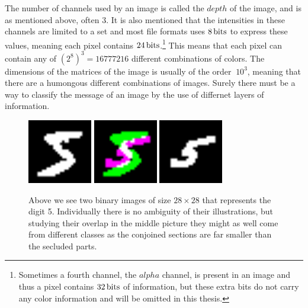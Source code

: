 The number of channels used by an image is called the $depth$ of the image, and is as mentioned above, often 3. It is also mentioned that the intensities in these channels are limited to a set and most file formats uses $\unit[8]{bits}$ to express these values, meaning each pixel contains $\unit[24]{bits}$.\footnote{Sometimes a fourth channel, the $alpha$ channel, is present in an image and thus a pixel contains $\unit[32]{bits}$ of information, but these extra bits do not carry any color information and will be omitted in this thesis.} This means that each pixel can contain any of $(2^8)^3=16777216$ different combinations of colors. The dimensions of the matrices of the image is usually of the order $~10^3$, meaning that there are a humongous different combinations of images. Surely there must be a way to classify the message of an image by the use of differnet layers of information.

\begin{figure}[H]
    \centering
    \includegraphics[width=0.25\textwidth]{figure/computer_vision/images/first.png}
    \includegraphics[width=0.25\textwidth]{figure/computer_vision/images/overlap.png}
    \includegraphics[width=0.25\textwidth]{figure/computer_vision/images/second.png}
    \caption{\label{pic:overlap} Above we see two binary images of size $28 \times 28$ that represents the digit 5. Individually there is no ambiguity of their illustrations, but studying their overlap in the middle picture they might as well come from different classes as the conjoined sections are far smaller than the secluded parts.}
\end{figure}

